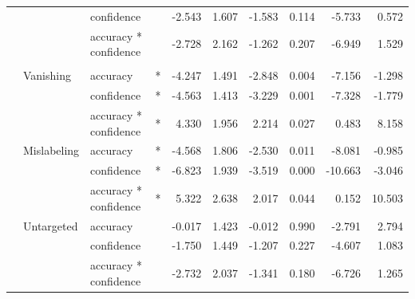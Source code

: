\documentclass[
]{article}
\begin{document}
\begin{longtable}[t]{llllrrrrrr}
\cmidrule{3-10}\nopagebreak
\hspace{1em} &  & confidence &  & -2.543 & 1.607 & -1.583 & 0.114 & -5.733 & 0.572\\
\cmidrule{3-10}\nopagebreak
\hspace{1em} &  & accuracy * confidence &  & -2.728 & 2.162 & -1.262 & 0.207 & -6.949 & 1.529\\
\cmidrule{1-10}\pagebreak[0]
\addlinespace[0.3em]
\multicolumn{10}{l}{\textbf{Cascade R-CNN}}\\
\hspace{1em} & Vanishing & accuracy & * & -4.247 & 1.491 & -2.848 & 0.004 & -7.156 & -1.298\\
\cmidrule{3-10}\nopagebreak
\hspace{1em} &  & confidence & * & -4.563 & 1.413 & -3.229 & 0.001 & -7.328 & -1.779\\
\cmidrule{3-10}\nopagebreak
\hspace{1em} &  & accuracy * confidence & * & 4.330 & 1.956 & 2.214 & 0.027 & 0.483 & 8.158\\
\cmidrule{2-10}\nopagebreak
\hspace{1em} & Mislabeling & accuracy & * & -4.568 & 1.806 & -2.530 & 0.011 & -8.081 & -0.985\\
\cmidrule{3-10}\nopagebreak
\hspace{1em} &  & confidence & * & -6.823 & 1.939 & -3.519 & 0.000 & -10.663 & -3.046\\
\cmidrule{3-10}\nopagebreak
\hspace{1em} &  & accuracy * confidence & * & 5.322 & 2.638 & 2.017 & 0.044 & 0.152 & 10.503\\
\cmidrule{2-10}\nopagebreak
\hspace{1em} & Untargeted & accuracy &  & -0.017 & 1.423 & -0.012 & 0.990 & -2.791 & 2.794\\
\cmidrule{3-10}\nopagebreak
\hspace{1em} &  & confidence &  & -1.750 & 1.449 & -1.207 & 0.227 & -4.607 & 1.083\\
\cmidrule{3-10}\nopagebreak
\hspace{1em} &  & accuracy * confidence &  & -2.732 & 2.037 & -1.341 & 0.180 & -6.726 & 1.265\\
\bottomrule
\end{longtable}
\endgroup{}
\end{document}
